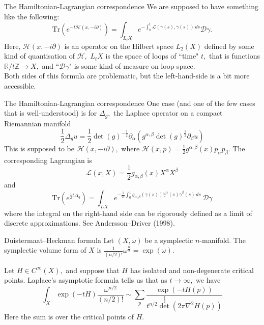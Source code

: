 \documentclass{beamer}
\numberwithin{equation}{section}
\theoremstyle{plain}
\theoremstyle{plain}
\theoremstyle{definition}
\theoremstyle{plain}
\theoremstyle{plain}
\theoremstyle{definition}
\newcommand{\Rl}{\mathbb{R}}
\newcommand{\Itgr}{\mathbb{Z}}
\newcommand{\Dc}{\mathcal{D}}
\newcommand{\Hc}{\mathcal{H}}
\newcommand{\Lc}{\mathcal{L}}
\newcommand{\Tr}{\mathrm{Tr}}
\begin{document}
\begin{frame}{The Hamiltonian-Lagrangian correspondence}
  We are supposed to have something like the following:
  \begin{equation}
    \Tr(e^{-t\Hc(x,-i\partial)}) = \int_{L_tX} e^{-\int_0^t \Lc(\gamma(s),\dot{\gamma}(s))\,ds} \Dc \gamma.
  \end{equation}
  Here, $\Hc(x,-i\partial)$ is an operator on the Hilbert space $L_2(X)$ defined by some kind of quantisation of $\Hc,$ $L_tX$ is the space of loops of ``time" $t,$ that is functions $\Rl/t\Itgr \to X,$ and ``$\Dc\gamma$" is some kind of measure on loop space.\\
  
  \pause
  Both sides of this formula are problematic, but the left-hand-side is a bit more accessible. 
\end{frame}

\begin{frame}{The Hamiltonian-Lagrangian correspondence}
  One case (and one of the few cases that is well-understood) is for $\Delta_g,$ the Laplace operator on a compact Riemannian manifold
  \[
    \frac12\Delta_gu = \frac12\det(g)^{-\frac12}\partial_{\alpha}(g^{\alpha,\beta}\det(g)^{\frac12}\partial_{\beta}u)
  \]
  This is supposed to be $\Hc(x,-i\partial),$ where $\Hc(x,p) = \frac12 g^{\alpha,\beta}(x)p_{\alpha}p_{\beta}.$ The corresponding Lagrangian is
  \[
    \Lc(x,X) = \frac12 g_{\alpha,\beta}(x)X^{\alpha}X^{\beta}
  \]
  and
  \[
    \Tr(e^{\frac12 t\Delta_g}) = \int_{LX} e^{-\frac{1}{2t}\int_0^1 g_{\alpha,\beta}(\gamma(s))\dot{\gamma}^{\alpha}(s)\dot{\gamma}^\beta(s)\,ds}\, \Dc \gamma
  \]
  where the integral on the right-hand side can be rigorously defined as a limit of discrete approximations. See Andersson--Driver (1998).
\end{frame}

\begin{frame}{Duistermaat--Heckman formula}
  Let $(X,\omega)$ be a symplectic $n$-manifold. The symplectic volume form of $X$ is $\frac{1}{(n/2)!}\omega^{\frac{n}{2}} = \exp(\omega).$

  Let $H\in C^\infty(X),$ and suppose that $H$ has isolated and non-degenerate critical points. Laplace's asymptotic formula tells us that as $t\to\infty,$ we have
  \[
    \int_{X} \exp(-tH) \frac{\omega^{n/2}}{(n/2)!} \sim \sum_{p} \frac{\exp(-tH(p))}{t^{n/2}\det^{\frac12}(2\pi \nabla^2 H(p))}
  \]
  Here the sum is over the critical points of $H.$
\end{frame}
\end{document}
